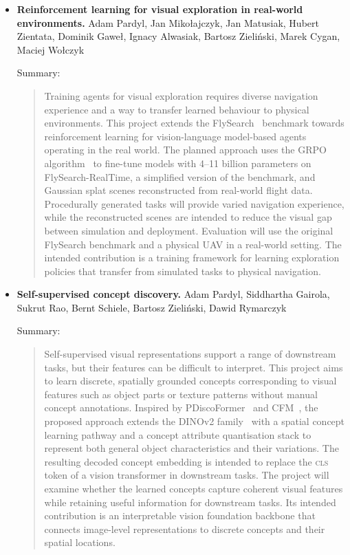 \begin{itemize}
    \item \textbf{Reinforcement learning for visual exploration in real-world environments.} Adam Pardyl, Jan Mikołajczyk, Jan Matusiak, Hubert Zientata, Dominik Gaweł, Ignacy Alwasiak, Bartosz Zieliński, Marek Cygan, Maciej Wołczyk
    
    Summary:
    \begin{quote}
    Training agents for visual exploration requires diverse navigation experience and a way to transfer learned behaviour to physical environments. This project extends the FlySearch~ benchmark towards reinforcement learning for vision-language model-based agents operating in the real world. The planned approach uses the GRPO algorithm~\cite{shao2024deepseekmath} to fine-tune models with 4--11 billion parameters on FlySearch-RealTime, a simplified version of the benchmark, and Gaussian splat scenes reconstructed from real-world flight data. Procedurally generated tasks will provide varied navigation experience, while the reconstructed scenes are intended to reduce the visual gap between simulation and deployment. Evaluation will use the original FlySearch benchmark and a physical UAV in a real-world setting. The intended contribution is a training framework for learning exploration policies that transfer from simulated tasks to physical navigation.
    \end{quote}

    \item \textbf{Self-supervised concept discovery.} Adam Pardyl, Siddhartha Gairola, Sukrut Rao, Bernt Schiele, Bartosz Zieliński, Dawid Rymarczyk
    
    Summary:
    \begin{quote}
    Self-supervised visual representations support a range of downstream tasks, but their features can be difficult to interpret. This project aims to learn discrete, spatially grounded concepts corresponding to visual features such as object parts or texture patterns without manual concept annotations. Inspired by PDiscoFormer~\cite{aniraj2024pdiscoformer} and CFM~\cite{wittenmayer2026cfm}, the proposed approach extends the DINOv2 family~\cite{oquab2024dinov2} with a spatial concept learning pathway and a concept attribute quantisation stack to represent both general object characteristics and their variations. The resulting decoded concept embedding is intended to replace the \textsc{cls} token of a vision transformer in downstream tasks. The project will examine whether the learned concepts capture coherent visual features while retaining useful information for downstream tasks. Its intended contribution is an interpretable vision foundation backbone that connects image-level representations to discrete concepts and their spatial locations.
    \end{quote}
    
\end{itemize}

